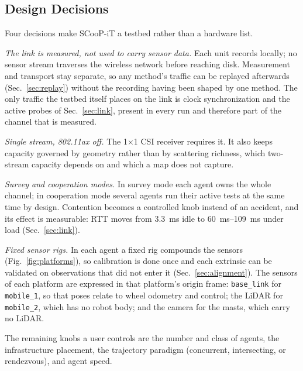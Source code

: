 \documentclass[journal]{IEEEtran}
\begin{document}
\subsection{Design Decisions}
\label{sec:decisions}
Four decisions make SCooP-iT a testbed rather than a hardware list.

\emph{The link is measured, not used to carry sensor data.} Each unit
records locally; no sensor stream traverses the wireless network
before reaching disk. Measurement and transport stay separate, so any
method's traffic can be replayed afterwards (Sec.~\ref{sec:replay})
without the recording having been shaped by one method. The only
traffic the testbed itself places on the link is clock synchronization
and the active probes of Sec.~\ref{sec:link}, present in every run and
therefore part of the channel that is measured.

\emph{Single stream, 802.11ax off.} The 1$\times$1 CSI receiver
requires it. It also keeps capacity governed by geometry rather than
by scattering richness, which two-stream capacity depends on and which
a map does not capture.

\emph{Survey and cooperation modes.} In survey mode each agent owns
the whole channel; in cooperation mode several agents run their active
tests at the same time by design. Contention becomes a controlled knob
instead of an accident, and its effect is measurable: RTT moves from
\SI{3.3}{\milli\second} idle to \SIrange{60}{109}{\milli\second} under
load (Sec.~\ref{sec:link}).

\emph{Fixed sensor rigs.} In each agent a fixed rig compounds the
sensors (Fig.~\ref{fig:platforms}), so calibration is done once and
each extrinsic can be validated on observations that did not enter it
(Sec.~\ref{sec:alignment}). The sensors of each platform are expressed
in that platform's origin frame: \texttt{base\_link} for
\texttt{mobile\_1}, so that poses relate to wheel odometry and control;
the LiDAR for \texttt{mobile\_2}, which has no robot body; and the
camera for the masts, which carry no LiDAR.

The remaining knobs a user controls are the number and class of
agents, the infrastructure placement, the trajectory paradigm
(concurrent, intersecting, or rendezvous), and agent speed.
\end{document}
